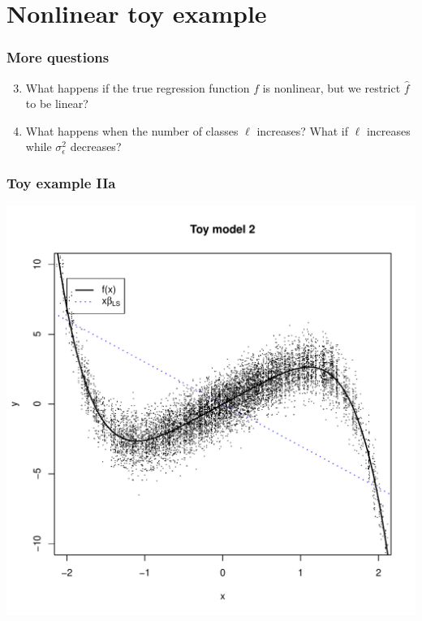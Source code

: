 \documentclass{beamer}
\begin{document}
\section{Nonlinear toy example}
\frame{\sectionpage}

\begin{frame}
\frametitle{More questions}
\begin{enumerate}
\setcounter{enumi}{2}
\item
What happens if the true regression function $f$ is nonlinear,
but we restrict $\hat{f}$ to be linear?
\item
What happens when the number of classes $\ell$ increases?
What if $\ell$ increases while $\sigma^2_\epsilon$ decreases?
\end{enumerate}
\end{frame}

\begin{frame}
\frametitle{Toy example IIa}
\begin{center}
\includegraphics[scale = 0.4]{toy3a_plot.pdf}
\end{center}
\end{frame}
\end{document}
